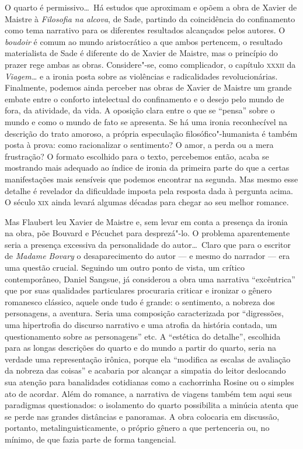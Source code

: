 O quarto é permissivo\ldots\  Há estudos que aproximam e opõem a obra de
Xavier de Maistre à \textit{Filosofia na alcova}, de Sade, partindo da
coincidência do confinamento como tema narrativo para os diferentes
resultados alcançados pelos autores. O \textit{boudoir} é comum ao
mundo aristocrático a que ambos pertencem, o resultado materialista de
Sade é diferente do de Xavier de Maistre, mas o princípio do prazer
rege ambas as obras. Considere"-se, como complicador, o capítulo \textsc{xxxii}
da \textit{Viagem\ldots} e a ironia posta sobre as violências e
radicalidades revolucionárias. Finalmente, podemos ainda perceber nas
obras de Xavier de Maistre um grande embate entre o conforto
intelectual do confinamento e o desejo pelo mundo de fora, da
atividade, da vida. A oposição clara entre o que se ``pensa'' sobre o
mundo e como o mundo de fato se apresenta. Se há uma ironia
reconhecível na descrição do trato amoroso, a própria especulação
filosófico"-humanista é também posta à prova: como racionalizar o
sentimento? O amor, a perda ou a mera frustração? O formato escolhido
para o texto, percebemos então, acaba se mostrando mais adequado ao
índice de ironia da primeira parte do que a certas manifestações mais
sensíveis que podemos encontrar na segunda. Mas mesmo esse detalhe é
revelador da dificuldade imposta pela resposta dada à pergunta acima. O
século \textsc{xix} ainda levará algumas décadas para chegar ao seu melhor
romance.

Mas Flaubert leu Xavier de Maistre e, sem levar em conta a presença da
ironia na obra, põe Bouvard e Pécuchet para desprezá"-lo. O problema
aparentemente seria a presença excessiva da personalidade do autor\ldots\
Claro que para o escritor de \textit{Madame Bovary} o desaparecimento
do autor --- e mesmo do narrador --- era uma questão crucial. Seguindo
um outro ponto de vista, um crítico contemporâneo, Daniel Sangsue, já considerou a obra
uma narrativa ``excêntrica'' que por suas qualidades particulares
procuraria criticar e ironizar o gênero romanesco clássico, aquele onde
tudo é grande: o sentimento, a nobreza dos personagens, a aventura.
Seria uma composição caracterizada por ``digressões, uma hipertrofia do
discurso narrativo e uma atrofia da história contada, um questionamento
sobre as personagens'' etc. A ``estética do detalhe'', escolhida para as
longas descrições do quarto e do mundo a partir do quarto, seria na
verdade uma representação irônica, porque ela ``modifica as escalas de
avaliação da nobreza das coisas'' e acabaria por alcançar a simpatia do
leitor deslocando sua atenção para banalidades cotidianas como a
cachorrinha Rosine ou o simples ato de acordar. Além do romance, a
narrativa de viagens também tem aqui seus paradigmas questionados: o
isolamento do quarto possibilita a minúcia atenta que se perde nas
grandes distâncias e panoramas. A obra colocaria em discussão,
portanto, metalinguisticamente, o próprio gênero a que pertenceria ou,
no mínimo, de que fazia parte de forma tangencial.


